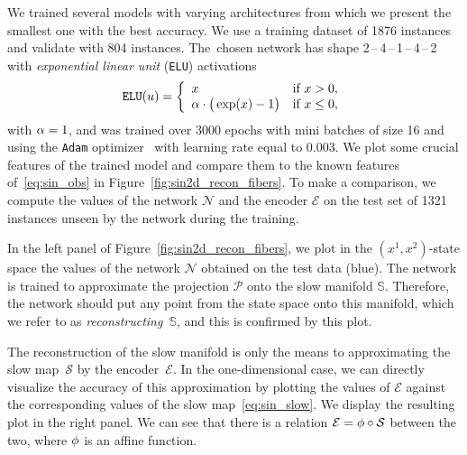 \documentclass{article}
\newcommand{\enc}{\mathcal{E}} %
\newcommand{\net}{\mathcal{N}} %
\newcommand{\proj}{\mathcal{P}} %
\newcommand{\smap}{\mathcal{S}} %
\newcommand{\sman}{\mathbb{S}} %
\begin{document}
We trained several models with varying architectures from which we present the smallest one with the best accuracy. We use a training dataset of 1876 instances and validate with 804 instances. The~chosen network has shape 2\,--\,4\,--\,1\,--\,4\,--\,2 with \textit{exponential linear unit} (\texttt{ELU}) activations
\begin{equation*}
    \texttt{ELU}(u)=\left\{
        \begin{array}{lc}
            x & \text{if}\ x>0,\\
            \alpha\cdot\big(\exp(x)-1\big) & \text{if}\ x\leq0,
        \end{array}
    \right.
\end{equation*}
with $\alpha=1$, and was trained over 3000 epochs with mini batches of size 16 and using the \texttt{Adam} optimizer~\cite{kingma2017adam} with learning rate equal to 0.003. We plot some crucial features of the trained model and compare them to the known features of~\eqref{eq:sin_obs} in Figure~\ref{fig:sin2d_recon_fibers}. To make a comparison, we compute the values of the network $\net$ and the encoder $\enc$ on the test set of 1321 instances unseen by the network during the training.

In the left panel of Figure~\ref{fig:sin2d_recon_fibers}, we plot in the $(x^1,x^2)$-state space the values of the network $\net$ obtained on the test data (blue). The network is trained to approximate the projection $\proj$ onto the slow manifold $\sman$. Therefore, the network should put any point from the state space onto this manifold, which we refer to as \emph{reconstructing}~$\sman$, and this is confirmed by this plot.

The reconstruction of the slow manifold is only the means to approximating the slow map~$\smap$ by the encoder~$\enc$. In the one-dimensional case, we can directly visualize the accuracy of this approximation by plotting the values of $\enc$ against the corresponding values of the slow map~\eqref{eq:sin_slow}. We display the resulting plot in the right panel. We can see that there is a relation $\enc = \ph\circ\smap$ between the two, where $\phi$ is an affine function.
\end{document}
